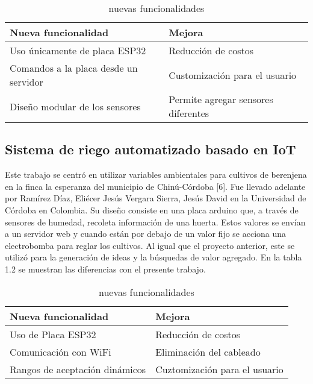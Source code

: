 \begin{table}[h]
	\centering
	\caption[Nuevas funcionalidades sobre el proyecto de Cadavid y Garcia]{nuevas funcionalidades}
	\begin{tabular}{l l}    
		\toprule
		\textbf{Nueva funcionalidad} & \textbf{Mejora}\\	
		\midrule
		Uso únicamente de placa ESP32           & Reducción de costos	\\		
		Comandos a la placa desde un servidor          & Customización para el usuario\\	
		Diseño modular de los sensores          & Permite agregar sensores diferentes\\	
		\bottomrule
		\hline
	\end{tabular}
	\label{tab:peces}
\end{table}

\subsection{Sistema de riego automatizado basado en IoT}
Este trabajo se centró en utilizar variables ambientales para cultivos de berenjena en la finca la esperanza del municipio de Chinú-Córdoba [6]. Fue llevado adelante por Ramírez Díaz, Eliécer Jesús Vergara Sierra, Jesús David en la Universidad de Córdoba en Colombia. 
Su diseño consiste en una placa arduino que, a través de sensores de humedad, recoleta información de una huerta. Estos valores se envían a un servidor web y cuando están por debajo de un valor fijo se acciona una electrobomba para reglar los cultivos. Al igual que el proyecto anterior, este se utilizó para la generación de ideas y la búsquedas de valor agregado. En la tabla 1.2 se muestran las diferencias con el presente trabajo.\\

\begin{table}[h]
	\centering
	\caption[Nuevas funcionalidades sobre el proyecto de Díaz y Sierra]{nuevas funcionalidades}
	\begin{tabular}{l l}    
		\toprule
		\textbf{Nueva funcionalidad} & \textbf{Mejora}\\	
		\midrule
		Uso de Placa ESP32           & Reducción de costos	\\		
		Comunicación con WiFi          & Eliminación del cableado\\	
		Rangos de aceptación dinámicos          & Cuztomización para el usuario\\		
		\bottomrule
		\hline
	\end{tabular}
	\label{tab:peces}\\
\end{table}

